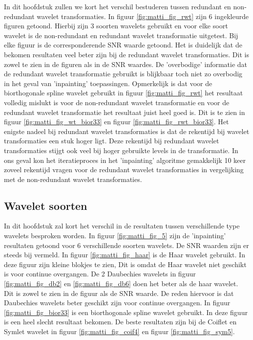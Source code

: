 In dit hoofdstuk zullen we kort het verschil bestuderen tussen redundant en non-redundant wavelet transformaties. In figuur \ref{fig:matti_fig_rwt} zijn 6 ingekleurde figuren getoond. Hierbij zijn 3 soorten wavelets gebruikt en voor elke soort wavelet is de non-redundant en redundant wavelet transformatie uitgetest. Bij elke figuur is de corresponderende SNR waarde getoond. Het is duidelijk dat de bekomen resultaten veel beter zijn bij de redundant wavelet transformaties. Dit is zowel te zien in de figuren als in de SNR waardes. De 'overbodige' informatie dat de redundant wavelet transformatie gebruikt is blijkbaar toch niet zo overbodig in het geval van 'inpainting' toepassingen. Opmerkelijk is dat voor de biorthogonale spline wavelet gebruikt in figuur \ref{fig:matti_fig_rwt} het resultaat volledig mislukt is voor de non-redundant wavelet transformatie en voor de redundant wavelet transformatie het resultaat juist heel goed is. Dit is te zien in figuur \ref{fig:matti_fig_wt_bior33} en figuur \ref{fig:matti_fig_rwt_bior33}.
\newline
\newline
Het enigste nadeel bij redundant wavelet transformaties is dat de rekentijd bij wavelet transformaties een stuk hoger ligt. Deze rekentijd bij redundant wavelet transformaties stijgt ook veel bij hoger gebruikte levels in de transformatie. In ons geval kon het iteratieproces in het 'inpainting' algoritme gemakkelijk 10 keer zoveel rekentijd vragen voor de redundant wavelet transformaties in vergelijking met de non-redundant wavelet transformaties.

\subsection{Wavelet soorten}

In dit hoofdstuk zal kort het verschil in de resultaten tussen verschillende type wavelets besproken worden. In figuur \ref{fig:matti_fig_5} zijn de 'inpainting' resultaten getoond voor 6 verschillende soorten wavelets. De SNR waarden zijn er steeds bij vermeld. In figuur \ref{fig:matti_fig_haar} is de Haar wavelet gebruikt. In deze figuur zijn kleine blokjes te zien, Dit is omdat de Haar wavelet niet geschikt is voor continue overgangen.  De 2 Daubechies wavelets in figuur \ref{fig:matti_fig_db2} en \ref{fig:matti_fig_db6} doen het beter als de haar wavelet. Dit is zowel te zien in de figuur als de SNR waarde. De reden hiervoor is dat Daubechies wavelets beter geschikt zijn voor continue overgangen. In figuur \ref{fig:matti_fig_bior33} is een biorthogonale spline wavelet gebruikt. In deze figuur is een heel slecht resultaat bekomen. De beste resultaten zijn bij de Coiflet en Symlet wavelet in figuur \ref{fig:matti_fig_coif4} en figuur \ref{fig:matti_fig_sym5}.

